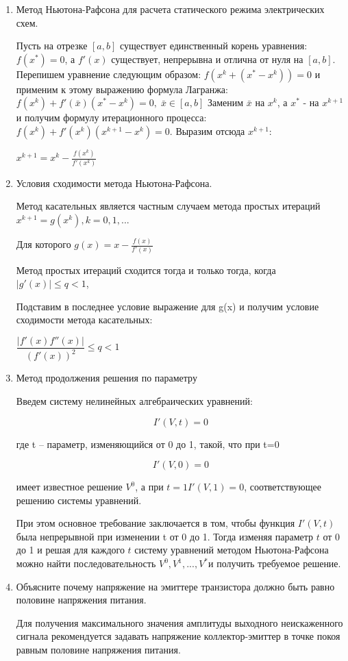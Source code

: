 \documentclass[a4paper,14pt]{article}
\begin{document}
\begin{enumerate}
	\item Метод Ньютона-Рафсона для расчета статического режима электрических схем.
	
	Пусть на отрезке $[a,b]$ существует единственный корень уравнения: $f(x^*)=0$, 
	а $f'(x)$ существует, непрерывна и отлична от нуля на $[a,b]$. Перепишем уравнение следующим образом: $f(x^k+(x^*-x^k))=0$
	и применим к этому выражению формула Лагранжа:
	$f(x^k)+f'(\bar{x})(x^*-x^k)=0, \;\bar{x} \in [a,b]$
	Заменим $ \bar x$ на $x^k$, а $x^*$ - на $x^{k+1}$ и получим формулу итерационного процесса:
    $f(x^k)+f'(x^k)(x^{k+1}-x^k)=0.$
	Выразим отсюда $x^{k+1}$:
	
	$x^{k+1}=x^k-\frac{f(x^k)}{f'(x^k)}$
	
	\item Условия сходимости метода Ньютона-Рафсона.

	Метод касательных является частным случаем метода простых итераций $x^{k+1} = g(x^k), k = 0,1,...$
	
	Для которого $g(x) = x - \frac{f(x)}{f'(x)}$
	
	Метод простых итераций сходится тогда и только тогда, когда $|g'(x)|\leq q<1$,
	
	Подставим в последнее условие выражение для g(x) и получим условие сходимости метода касательных:
	
	$\dfrac{\left|f'(x)f''(x) \right|}{(f'(x))^2} \leq q < 1 $
	
	
	\item Метод продолжения решения по параметру
		
	Введем систему нелинейных алгебраических уравнений: 
	
	$$I'(V,t) = 0$$
	
	где t – параметр, изменяющийся от 0 до 1, такой, что при t=0 
	
	$$I'(V,0) =0$$
	
	имеет известное решение $V^0$, а при $t=1 I'(V,1)=0$, соответствующее решению системы уравнений.
	
	При этом основное требование заключается в том, чтобы функция $I'(V,t)$ была непрерывной при изменении t от 0 до 1.
	Тогда изменяя параметр $t$ от 0 до 1 и решая для каждого $t$ систему уравнений методом Ньютона-Рафсона можно найти последовательность $V^0, V^1,...,V^*$и получить требуемое решение.
	
	\item Объясните почему напряжение на эмиттере транзистора должно быть равно половине напряжения питания.
	
	Для получения максимального значения амплитуды выходного неискаженного сигнала рекомендуется задавать напряжение коллектор-эмиттер в точке покоя равным половине напряжения питания.
\end{enumerate}
\end{document}
